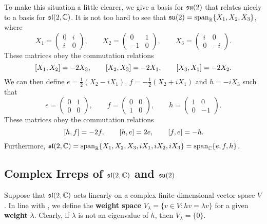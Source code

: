 \documentclass[a4paper]{article}
\begin{document}
To make this situation a little clearer, we give a basis for $\mathfrak{su}(2)$ that relates nicely to a basis for $\mathfrak{sl}(2, \mathbb{C})$. It is not too hard to see that $\mathfrak{su}(2) = \text{span}_{\mathbb{R}}\{X_1, X_2, X_3\}$, where
$$X_1 = \begin{pmatrix}0 & i \\ i & 0\end{pmatrix}, \hspace{2em} X_2 = \begin{pmatrix}0 & 1 \\ -1 & 0\end{pmatrix}, \hspace{2em} X_3 = \begin{pmatrix}i & 0 \\ 0 & -i\end{pmatrix}.$$
These matrices obey the commutation relations
$$\left[ X_1, X_2 \right] = -2X_3, \hspace{2em} \left[ X_2, X_3 \right] = -2X_1, \hspace{2em} \left[ X_3, X_1 \right] = -2X_2.$$
We can then define ${e} = \frac{1}{2}(X_2 - iX_1)$, ${f} = -\frac{1}{2}(X_2 + iX_1)$ and ${h} = -iX_3$ such that
$${e} = \begin{pmatrix}0 & 1 \\ 0 & 0\end{pmatrix}, \hspace{2em} {f} = \begin{pmatrix}0 & 0 \\ 1 & 0\end{pmatrix}, \hspace{2em} {h} = \begin{pmatrix}1 & 0 \\ 0 & -1\end{pmatrix}.$$
These matrices obey the commutation relations
$$\left[ {h}, {f} \right] = -2{f}, \hspace{2em} \left[ {h}, {e} \right] = 2{e}, \hspace{2em} \left[ {f}, {e} \right] = -{h}.$$
Furthermore, $\mathfrak{sl}(2, \mathbb{C}) = \text{span}_{\mathbb{R}}\{X_1, X_2, X_3, iX_1, iX_2, iX_3\} = \text{span}_{\mathbb{C}}\{{e}, {f}, {h}\}$.

\subsection{Complex Irreps of \texorpdfstring{$\mathfrak{sl}(2, \mathbb{C})$}{sl(2, \C)} and \texorpdfstring{$\mathfrak{su}(2)$}{su(2))}}

Suppose that $\mathfrak{sl}(2, \mathbb{C})$ acts linearly on a complex finite dimensional vector space $V$. In line with \cite{taylor}, we define the \textbf{weight space} $V_\lambda = \{v \in V : {h}v = \lambda v\}$ for a given \textbf{weight} $\lambda$. Clearly, if $\lambda$ is not an eigenvalue of ${h}$, then $V_\lambda = \{0\}$.
\end{document}

